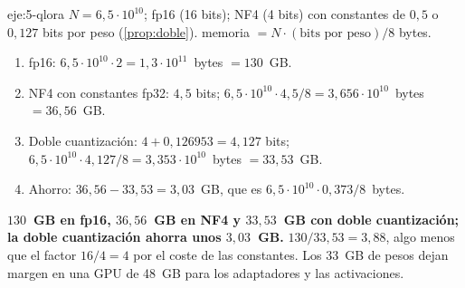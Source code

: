 \begin{solucion}{eje:5-qlora}
\datos $N=6{,}5\cdot 10^{10}$; fp16 (16 bits); NF4 (4 bits) con constantes de $0{,}5$ o $0{,}127$ bits por peso (\cref{prop:doble}).
\planteamiento memoria $=N\cdot(\text{bits por peso})/8$ bytes.
\pasos
\begin{enumerate}[label=\arabic*.]
  \item fp16: $6{,}5\cdot 10^{10}\cdot 2=1{,}3\cdot 10^{11}$~bytes $=130$~GB.
  \item NF4 con constantes fp32: $4{,}5$ bits; $6{,}5\cdot 10^{10}\cdot 4{,}5/8=3{,}656\cdot 10^{10}$~bytes $=36{,}56$~GB.
  \item Doble cuantización: $4+0{,}126953=4{,}127$ bits; $6{,}5\cdot 10^{10}\cdot 4{,}127/8=3{,}353\cdot 10^{10}$~bytes $=33{,}53$~GB.
  \item Ahorro: $36{,}56-33{,}53=3{,}03$~GB, que es $6{,}5\cdot 10^{10}\cdot 0{,}373/8$~bytes.
\end{enumerate}
\resultado \textbf{$130$~GB en fp16, $36{,}56$~GB en NF4 y $33{,}53$~GB con doble cuantización; la doble cuantización ahorra unos $3{,}03$~GB.}
\comprobacion $130/33{,}53=3{,}88$, algo menos que el factor $16/4=4$ por el coste de las constantes. Los 33~GB de pesos dejan margen en una GPU de 48~GB para los adaptadores y las activaciones.
\end{solucion}

